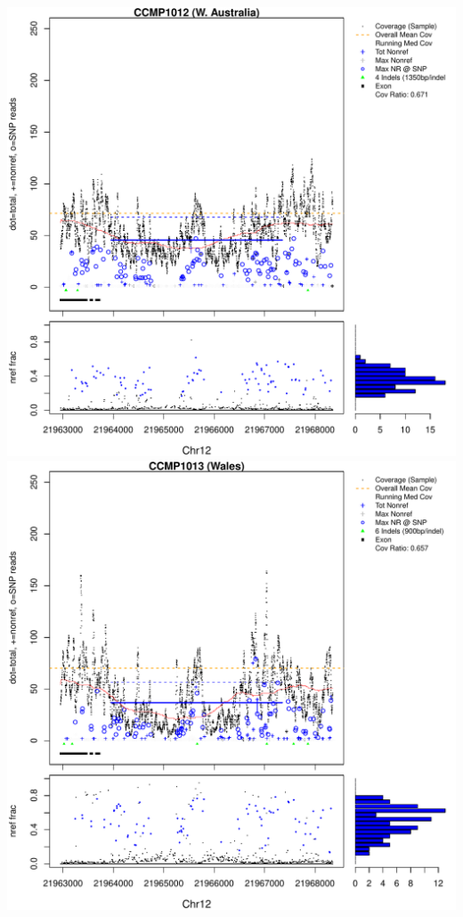\documentclass{article}\usepackage[]{graphicx}\usepackage[]{color}
\makeatletter
\def\maxwidth{ %
  \ifdim\Gin@nat@width>\linewidth
    \linewidth
  \else
    \Gin@nat@width
  \fi
}
\newenvironment{knitrout}{}{} %
\makeatother
\begin{document}
\begin{knitrout}
{\includegraphics[width=\maxwidth]{figs-knitr/unnamed-chunk-54-3} 
\includegraphics[width=\maxwidth]{figs-knitr/unnamed-chunk-54-4} 
}
\end{knitrout}
\end{document}
